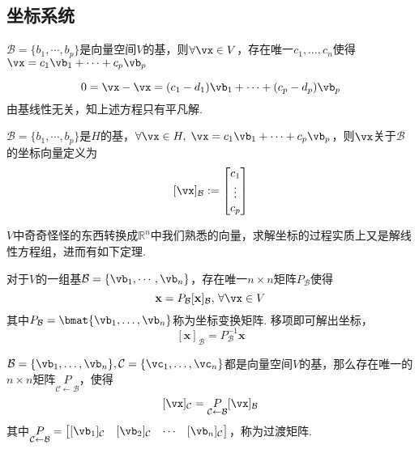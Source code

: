 \subsection{坐标系统}
\label{coordinate-system}
\begin{theorem}[向量唯一表示定理]
$\mathcal{B}=\{b_1,\cdots,b_p\}$是向量空间$V$的基，则$\forall\vx\in V$，存在唯一$c_1,\dots,c_n$使得$\vx=c_1\vb_1+\cdots+c_p\vb_p$
\end{theorem}
\begin{analysis}
\[0=\vx-\vx=(c_1-d_1)\vb_1+\cdots+(c_p-d_p)\vb_p\]
由基线性无关，知上述方程只有平凡解.
\end{analysis}
\begin{definition}[坐标向量]
$\mathcal{B}=\{b_1,\cdots,b_p\}$是$H$的基，$\forall\vx\in H,\;\vx=c_1\vb_1+\cdots+c_p\vb_p$，则$\vx$关于$\mathcal{B}$的坐标向量定义为
\[[\vx]_{\mathcal{B}}:=\begin{bmatrix}c_1\\ \vdots \\ c_p\end{bmatrix}\]
\end{definition}
$V$中奇奇怪怪的东西转换成$\mathbb{R}^n$中我们熟悉的向量，求解坐标的过程实质上又是解线性方程组，进而有如下定理.
\begin{theorem}[坐标变换矩阵]
对于$V$的一组基$\mathcal{B}=\{\vb_1,\cdots,\vb_n\}$，存在唯一$n\times n$矩阵$P_\mathcal{B}$使得
\[\mathbf{x}=P_\mathcal{B}[\mathbf{x}]_{\mathcal{B}},\,\forall \vx\in V\]
其中$P_\mathcal{B}=\bmat{\vb_1,\ldots,\vb_n}$称为坐标变换矩阵. 移项即可解出坐标，
\[[\mathbf{x}]_{\mathcal{B}}=P_\mathcal{B}^{-1} \mathbf{x}\]
\end{theorem}
\begin{theorem}[换基]
$\mathcal{B}=\{\vb_1,\dots,\vb_n\},\mathcal{C}=\{\vc_1,\dots,\vc_n\}$都是向量空间$V$的基，那么存在唯一的$n\times n$矩阵$\underset{\mathcal{C}\gets \mathcal{B}}{P}$，使得
\[[\vx]_{\mathcal{C}}=\underset{\mathcal{C}\gets \mathcal{B}}{P}[\vx]_{\mathcal{B}}\]
其中$\underset{\mathcal{C}\gets \mathcal{B}}{P}=\begin{bmatrix}[\vb_1]_{\mathcal{C}}&[\vb_2]_{\mathcal{C}}&\cdots&[\vb_n]_{\mathcal{C}}\end{bmatrix}$，称为过渡矩阵.
\end{theorem}
